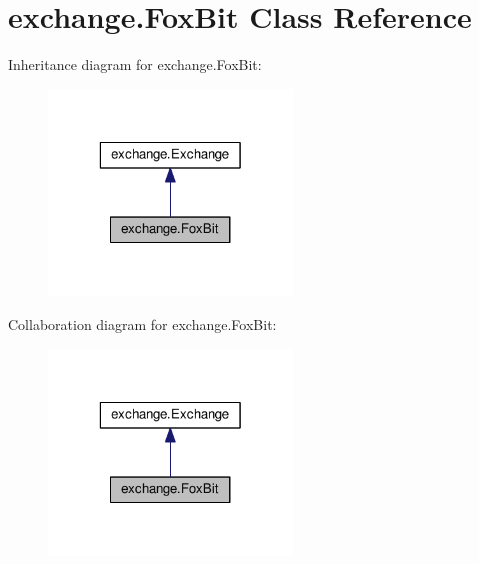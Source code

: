 \hypertarget{classexchange_1_1_fox_bit}{\section{exchange.\-Fox\-Bit Class Reference}
\label{classexchange_1_1_fox_bit}
}


Inheritance diagram for exchange.\-Fox\-Bit\-:
\nopagebreak
\begin{figure}[H]
\begin{center}
\leavevmode
\includegraphics[width=184pt]{classexchange_1_1_fox_bit__inherit__graph}
\end{center}
\end{figure}


Collaboration diagram for exchange.\-Fox\-Bit\-:
\nopagebreak
\begin{figure}[H]
\begin{center}
\leavevmode
\includegraphics[width=184pt]{classexchange_1_1_fox_bit__coll__graph}
\end{center}
\end{figure}
